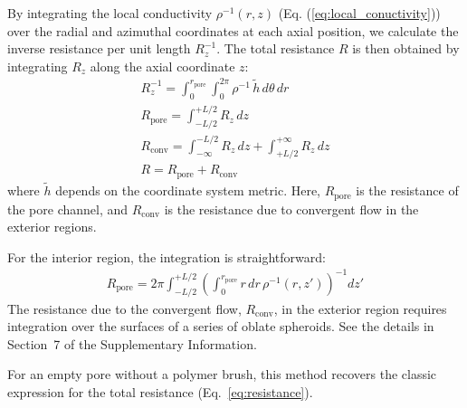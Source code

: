 \documentclass[12pt, a4paper]{article}
\begin{document}
By integrating the local conductivity $\rho^{-1}(r,z)$ (Eq. (\ref{eq:local_conuctivity})) over the radial and azimuthal coordinates at each axial position, we calculate the inverse resistance per unit length $R_z^{-1}$.
The total resistance $R$ is then obtained by integrating $R_z$ along the axial coordinate $z$:
\begin{eqnarray}
    \label{eq:R_z_inv}
    R_z^{-1} = \int_{0}^{r_{\text{pore}}}\int_{0}^{2\pi}\rho^{-1} \, \tilde{h} \, d\theta \, dr\\
    \label{eq:R_z_pore}
    R_{\text{pore}} = \int_{-L/2}^{+L/2} R_z \, dz\\
    \label{eq:R_z_conv}
    R_{\text{conv}} = \int_{-\infty}^{-L/2} R_z \, dz + \int_{+L/2}^{+\infty} R_z \, dz\\
    \label{eq:R_z_tot}
    R = R_{\text{pore}} + R_{\text{conv}}
\end{eqnarray}
where $\tilde{h}$ depends on the coordinate system metric. Here, $R_{\textrm{pore}}$ is the resistance of the pore channel, and $R_{\textrm{conv}}$ is the resistance due to convergent flow in the exterior regions.


For the interior region, the integration is straightforward:
\begin{eqnarray}
    R_{\text{pore}} = 2\pi\int_{-L/2}^{+L/2}\left(\int_{0}^{r_{\text{pore}}} r \, dr \, \rho^{-1}(r, z')\right)^{-1} dz'
    \label{eq:R_pore}
\end{eqnarray}
The resistance due to the convergent flow, $R_{\text{conv}}$, in the exterior region requires integration over the surfaces of a series of oblate spheroids.
See the details in Section~7 of the Supplementary Information.

For an empty pore without a polymer brush, this method recovers the classic expression for the total resistance (Eq.~\ref{eq:resistance}).
\end{document}
